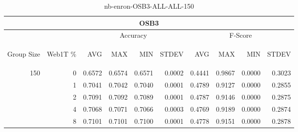 \begin{center}
\begin{table}[htbp]
\begin{tabular}{ | r | r | r | r | r | r | r | r | r | r |}
\hline
\multicolumn{10}{|c|}{OSB3}\\
\hline
 & & \multicolumn{4}{|c|}{Accuracy} & \multicolumn{4}{|c|}{F-Score}\\ \cline{3-10}
\begin{sideways}Group Size\end{sideways} & \begin{sideways}Web1T \%\end{sideways} & \begin{sideways}AVG\end{sideways} & \begin{sideways}MAX\end{sideways} & \begin{sideways}MIN\end{sideways} & \begin{sideways}STDEV\end{sideways} & \begin{sideways}AVG\end{sideways} & \begin{sideways}MAX\end{sideways} & \begin{sideways}MIN\end{sideways} & \begin{sideways}STDEV\end{sideways}\\
\hline
\multirow{4}{*}{150}
 & 0 & 0.6572 & 0.6574 & 0.6571 & 0.0002 & 0.4441 & 0.9867 & 0.0000 & 0.3023\\ \cline{2-10}
 & 1 & 0.7041 & 0.7042 & 0.7040 & 0.0001 & 0.4789 & 0.9127 & 0.0000 & 0.2855\\ \cline{2-10}
 & 2 & 0.7091 & 0.7092 & 0.7089 & 0.0001 & 0.4787 & 0.9146 & 0.0000 & 0.2875\\ \cline{2-10}
 & 4 & 0.7068 & 0.7071 & 0.7066 & 0.0003 & 0.4769 & 0.9189 & 0.0000 & 0.2874\\ \cline{2-10}
 & 8 & 0.7101 & 0.7101 & 0.7100 & 0.0001 & 0.4778 & 0.9151 & 0.0000 & 0.2878\\ \cline{2-10}
\hline
\end{tabular}
\caption{nb-enron-OSB3-ALL-ALL-150}
\label{table:nb-enron-OSB3-ALL-ALL-150}
\end{table}
\end{center}

